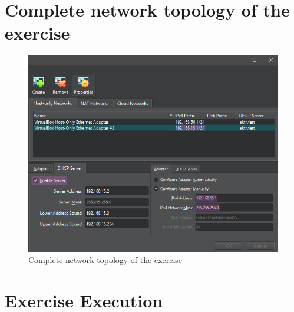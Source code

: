 \documentclass[a4paper]{article}
\newcommand{\abc}{\hfill \break}
\begin{document}
\section{Complete network topology of the exercise}
\begin{figure}[h]
	\includegraphics[scale=0.4]{./images/nwipsfr.png}
	\centering
	\caption{Complete network topology of the exercise}
\end{figure}\abc

\newpage

\section{Exercise Execution}
\end{document}
